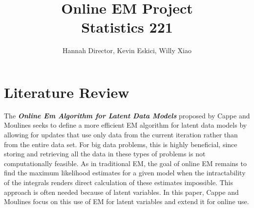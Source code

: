 \documentclass[12pt]{article}
\begin{document}
\title{Online EM Project\\ Statistics 221
}
\author{Hannah Director, Kevin Eskici, Willy Xiao}

\maketitle

\section{Literature Review}
The \textbf{\it{Online Em Algorithm for Latent Data Models}} proposed by Cappe and Moulines seeks to define a more efficient EM algorithm for latent data models by allowing for updates that use only data from the current iteration rather than from the entire data set. For big data problems, this is highly beneficial, since storing and retrieving all the data in these types of problems is not computationally feasible. As in traditional EM, the goal of online EM remains to find the maximum likelihood estimates for a given model when the intractability of the integrals renders direct calculation of these estimates impossible. This approach is often needed because of latent variables. In this paper, Cappe and Moulines focus on this use of EM for latent variables and extend it for online use.\\
\end{document}

